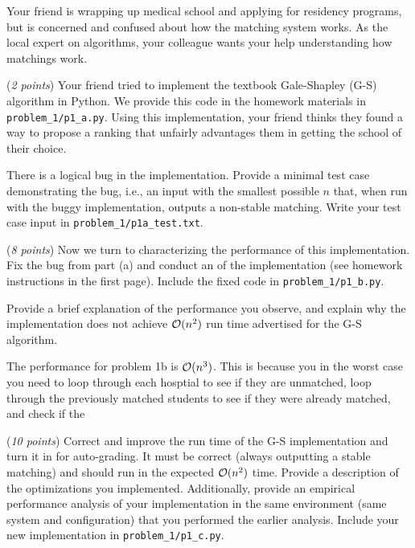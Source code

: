\documentclass{hw}
\begin{document}

\begin{problem}
Your friend is wrapping up medical school
and applying for residency programs, but is concerned and confused about how the matching
system works. As the local expert on algorithms, your colleague wants your 
help understanding how matchings work. 

\begin{subproblem}
  (\textit{2 points})
  Your friend tried to implement the textbook Gale-Shapley (G-S)
  algorithm in Python. We provide this code in the homework materials in \texttt{problem\_1/p1\_a.py}. 
  Using this implementation, your friend thinks they found a way to propose a
  ranking that unfairly advantages them in getting the school of their choice.

  There is a logical bug in the implementation. Provide a minimal test case
  demonstrating the bug, i.e., an input with the smallest possible $n$ 
  that, when run with the buggy implementation, outputs a non-stable matching. Write your test case input in \texttt{problem\_1/p1a\_test.txt}.  
  
\end{subproblem}

\begin{subproblem}
  (\textit{8 points})
  Now we turn to characterizing the performance of
  this implementation. Fix the bug from part (a) and conduct an 
   of the implementation (see homework instructions
  in the first page). Include the fixed code in \texttt{problem\_1/p1\_b.py}.

  Provide a brief explanation of the performance you observe, and explain why the implementation does not achieve $\mathcal{O}(n^2)$ run time advertised for the G-S algorithm.
\end{subproblem}

\begin{solution}
The performance for problem 1b is $\mathcal{O}(n^3)$. This is because you in the worst case you need to loop through each hosptial to see if they are unmatched, loop through the previously matched students to see if they were already matched, and check if the  
\end{solution}

\begin{subproblem}
\newcommand{\worstrank}{{\tt wr}}
(\textit{10 points})
Correct and improve the run time of the G-S implementation and turn it in for
  auto-grading. It must be correct (always outputting a stable matching) and should run in the expected $\mathcal{O}(n^2)$ time. 
  Provide a description of the optimizations you implemented.
  Additionally, provide an empirical performance analysis of your
  implementation in the same environment (same system and configuration) that
  you performed the earlier analysis. Include your new implementation in \texttt{problem\_1/p1\_c.py}.
\end{subproblem}


\end{problem}
\end{document}
